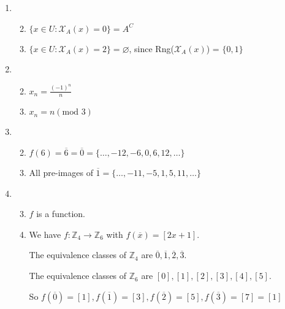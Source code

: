 \documentclass[12pt,letterpaper]{article}
\begin{document}
\begin{enumerate}
\begin{enumerate}
\begin{enumerate}
\begin{proof}
                Thus we have shown that $R$ is a function on $\mathbb{Z}$.
              \end{proof}
          \end{enumerate}
        \setcounter{enumii}{7}
        \item
          \begin{enumerate}
            \setcounter{enumiii}{1}
            \item $\{x \in U : \mathcal{X}_A(x) = 0\} = A^C$
            \item $\{x \in U : \mathcal{X}_A(x) = 2\} = \varnothing$,
              since Rng($\mathcal{X}_A(x)$) = $\{0, 1\}$
          \end{enumerate}
        \item
          \begin{enumerate}
            \setcounter{enumiii}{1}
            \item $x_n = \frac{(-1)^n}{n}$
            \setcounter{enumiii}{3}
            \item $x_n = n (\text{mod } 3)$
          \end{enumerate}
        \item
          \begin{enumerate}
            \setcounter{enumiii}{1}
            \item
              $f(6) = \overline{6} = \overline{0} = \{\dots, -12, -6, 0, 6, 12, \dots\}$
            \setcounter{enumiii}{3}
            \item
              All pre-images of $\overline{1} = \{\dots, -11, -5, 1, 5, 11, \dots\}$
          \end{enumerate}
        \item
          \begin{enumerate}
            \setcounter{enumiii}{2}
            \item $f$ is a function.
            \item
              We have $f : \mathbb{Z}_4 \to \mathbb{Z}_6$ with $f\left(\overline{x}\right) = [2x + 1]$.

              The equivalence classes of $\mathbb{Z}_4$ are $\overline{0}, \overline{1}, \overline{2}, \overline{3}$.

              The equivalence classes of $\mathbb{Z}_6$ are $[0], [1], [2], [3], [4], [5]$.

              So $f\left(\overline{0}\right) = [1], f\left(\overline{1}\right) = [3], f\left(\overline{2}\right) = [5], f\left(\overline{3}\right) = [7] = [1]$


\end{enumerate}
\end{enumerate}
\end{enumerate}
\end{document}

